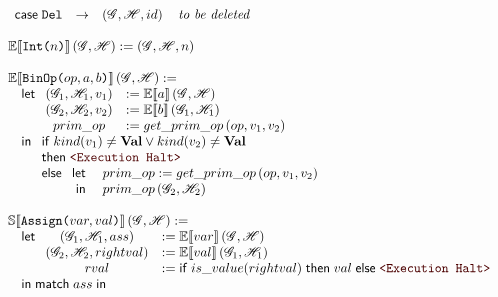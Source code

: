\begin{figure}
\[\begin{array}[t]{l}
\begin{array}[t]{lclr}
      \casem{\SDel} &\to& \left(\Glo, \Hea, id\right) \quad \textit{to be deleted} \\
    \end{array}\\
    \\
    \Ctx{E}{\SLit{Int}{n}}\left(\Glo, \Hea\right) := \left(\Glo, \Hea, n\right) \\
    \\
    \Ctx{E}{\SLit{BinOp}{op, a, b}}\left(\Glo, \Hea\right) := \\
    \quad \letm
       \begin{array}[t]{cl}
          \left(\Glo_1, \Hea_1, v_1\right) &:= \Ctx{E}{a}\left(\Glo, \Hea\right) \\
          \left(\Glo_2, \Hea_2, v_2\right) &:= \Ctx{E}{b}\left(\Glo_1, \Hea_1\right) \\
          prim\_op &:= get\_prim\_op\left(op, v_1, v_2\right) \\
       \end{array} \\
    \quad \inm
       \begin{array}[t]{l}
         \ifm kind(v_1) \neq \mathbf{Val} \vee kind(v_2) \neq \mathbf{Val} \\
         \thenm \Halt \\
         \elsem
            \begin{array}[t]{rl}
              \letm& prim\_op := get\_prim\_op\left(op, v_1, v_2\right) \\
              \inm& prim\_op\left(\Glo_2, \Hea_2\right)
            \end{array} \\
       \end{array} \\
    \\
    \Ctx{S}{\SLit{Assign}{var, val}}\left(\Glo, \Hea\right) := \\
    \quad \letm
       \begin{array}[t]{cl}
          \left(\Glo_1, \Hea_1, ass\right) &:= \Ctx{E}{var}\left(\Glo, \Hea\right) \\
          \left(\Glo_2, \Hea_2, rightval\right) &:= \Ctx{E}{val}\left(\Glo_1, \Hea_1\right) \\
          rval &:= \ifm is\_value(rightval) \;\thenm val \;\elsem \Halt \\
       \end{array} \\
    \quad \inm \matchm{ass} \\

\end{array}\]
\end{figure}
